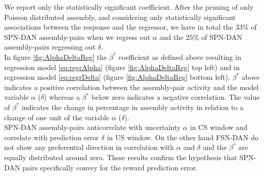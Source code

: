We report only the statistically significant coefficient. After the pruning of only Poisson distributed assembly, and considering only statistically significant associations between the response and the regressor, we have in total the $33\%$ of SPN-DAN assembly-pairs when we regress out $\alpha$ and the $25\%$ of SPN-DAN assembly-pairs regressing out $\delta$.\\In figure \ref{fig:AlphaDeltaReg} the $\beta^*$ coefficient as defined above resulting in regression model \ref{eq:regrAlpha} (figure \ref{fig:AlphaDeltaReg} top left) and in regression model \ref{eq:regrDelta} (figure \ref{fig:AlphaDeltaReg} bottom left). $\beta^*$ above indicates a positive correlation between the assembly-pair activity and the model variable $\alpha$ ($\delta$) whereas a $\beta^*$ below zero indicates a negative correlation. The value of $\beta^*$ indicates the change in percentage in assembly activity in relation to a change of one unit of the variable $\alpha$ ($\delta$).\\SPN-DAN assembly-pairs anticorrelate with uncertainty $\alpha$ in CS window and correlate with prediction error $\delta$ in US window. On the other hand FSN-DAN do not show any preferential direction in correlation with $\alpha$ and $\delta$ and the $\beta^*$ are equally distributed around zero. These results confirm the hypothesis that SPN-DAN pairs specifically convey for the reward prediction error.



